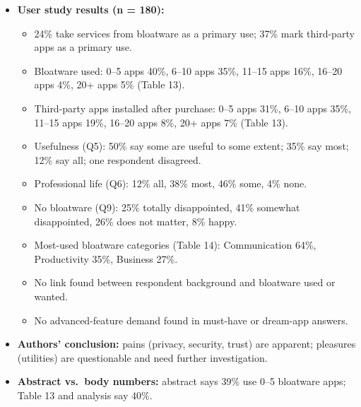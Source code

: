 \documentclass[11pt,a4paper]{article}
\begin{document}
\begin{enumerate}
\begin{itemize}[leftmargin=*, itemsep=1pt, topsep=2pt]
\begin{itemize}[itemsep=0pt]
            \item Samsung: ``ContextProvider'' known to collect user data; ``Wallpaper Cropper'' requests SMS reading.
            \item Vivo: ``BBKNotes'' and ``Bluetooth'' apps request SMS, call, contact permissions.
            \item Xiaomi: ``Calculator'' requests location and phone state; ``CleanMaster'' requests many sensitive permissions.
            \item ZTE: weather app requests running tasks, outgoing calls, manage accounts.
        \end{itemize}
        \item \textbf{User study results (n = 180):}
        \begin{itemize}[itemsep=0pt]
            \item 24\% take services from bloatware as a primary use; 37\% mark third-party apps as a primary use.
            \item Bloatware used: 0--5 apps 40\%, 6--10 apps 35\%, 11--15 apps 16\%, 16--20 apps 4\%, 20+ apps 5\% (Table 13).
            \item Third-party apps installed after purchase: 0--5 apps 31\%, 6--10 apps 35\%, 11--15 apps 19\%, 16--20 apps 8\%, 20+ apps 7\% (Table 13).
            \item Usefulness (Q5): 50\% say some are useful to some extent; 35\% say most; 12\% say all; one respondent disagreed.
            \item Professional life (Q6): 12\% all, 38\% most, 46\% some, 4\% none.
            \item No bloatware (Q9): 25\% totally disappointed, 41\% somewhat disappointed, 26\% does not matter, 8\% happy.
            \item Most-used bloatware categories (Table 14): Communication 64\%, Productivity 35\%, Business 27\%.
            \item No link found between respondent background and bloatware used or wanted.
            \item No advanced-feature demand found in must-have or dream-app answers.
        \end{itemize}
        \item \textbf{Authors' conclusion:} pains (privacy, security, trust) are apparent; pleasures (utilities) are questionable and need further investigation.
        \item \textbf{Abstract vs.\ body numbers:} abstract says 39\% use 0--5 bloatware apps; Table 13 and analysis say 40\%.
    \end{itemize}


\end{enumerate}
\end{document}
